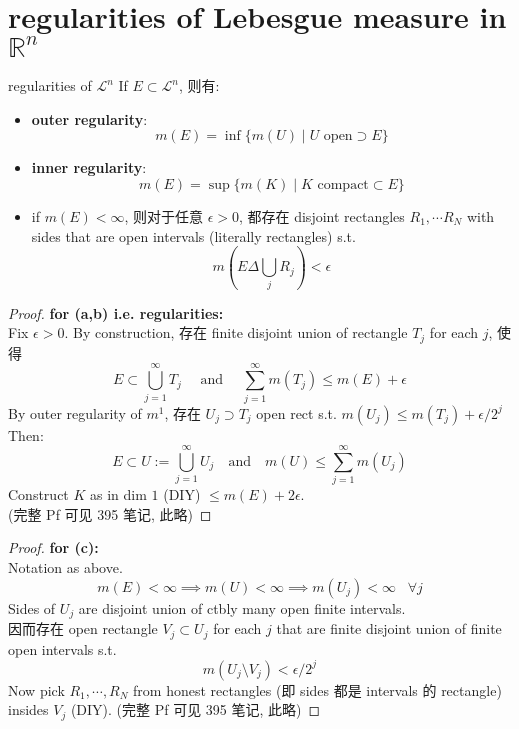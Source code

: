 \documentclass[lang=cn,11pt]{elegantbook}
\begin{document}
\section{regularities of Lebesgue measure in $\mathbb{R}^n$ }

\begin{theorem}{regularities of $\mathcal{L}^n$}
If $E \subset \mathcal{L}^n$, 则有: 
\begin{itemize}
    \item \textbf{outer regularity}: \[ m(E) = \inf \{  m(U) \mid U  \text{ open}   \supset E\}  \]
    \item \textbf{inner regularity}: \[ m(E) = \sup \{  m(K) \mid K  \text{ compact}   \subset E\}  \]
    \item if $m(E) < \infty$, 则对于任意 $\epsilon > 0$, 都存在 disjoint rectangles $R_1, \cdots R_N$ with sides that are open intervals (literally rectangles) s.t. \[ m(E  \Delta \bigcup_{j} R_j ) < \epsilon \]
\end{itemize}
\end{theorem}
\begin{proof}
 \textbf{   for (a,b) i.e. regularities: }\\
 Fix $\epsilon > 0 $. By construction, 存在 finite disjoint union of rectangle $T_j$ for each $j$, 使得 \[
 E \subset \bigcup_{j=1}^\infty T_j \quad \text{ and } \quad \sum_{j=1}^\infty m(T_j) \leq m(E) + \epsilon
 \]
By outer regularity of $m^1$, 存在 $U_j \supset T_j$ open rect s.t. $m(U_j) \leq m(T_j) + \epsilon / 2^j$
Then: \[
E \subset U := \bigcup_{j=1}^\infty U_j \quad \text{and} \quad m(U) \leq \sum_{j=1}^\infty m(U_j)
\]
Construct $K$ as in dim $1$ (DIY) $\leq m(E) + 2\epsilon$.\\
(完整 Pf 可见 395 笔记, 此略)
\end{proof}
\begin{proof}
 \textbf{   for (c):} \\
Notation as above.\\
\[
m(E) < \infty \implies m(U) < \infty \implies m(U_j)  < \infty \;\; \; \forall j
\]
Sides of $U_j$ are disjoint union of ctbly many open finite intervals.\\
因而存在 open rectangle $V_j \subset U_j$ for each $j$ that are finite disjoint union of finite open intervals s.t. \[
m(U_j  \setminus   V_j) < \epsilon / 2^j
\]
Now pick $R_1, \cdots, R_N$ from honest rectangles (即 sides 都是 intervals 的 rectangle) insides $V_j$ (DIY).
(完整 Pf 可见 395 笔记, 此略)
\end{proof}
\end{document}
